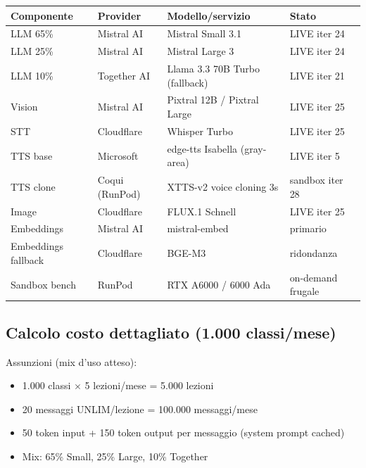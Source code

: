 \documentclass[12pt,a4paper]{article}
\begin{document}
\begin{center}
\renewcommand{\arraystretch}{1.3}
\begin{tabular}{l l l l}
\toprule
\textbf{Componente} & \textbf{Provider} & \textbf{Modello/servizio} & \textbf{Stato} \\
\midrule
LLM 65\%   & Mistral AI    & Mistral Small 3.1 & LIVE iter 24 \\
LLM 25\%   & Mistral AI    & Mistral Large 3   & LIVE iter 24 \\
LLM 10\%   & Together AI   & Llama 3.3 70B Turbo (fallback) & LIVE iter 21 \\
Vision     & Mistral AI    & Pixtral 12B / Pixtral Large    & LIVE iter 25 \\
STT        & Cloudflare    & Whisper Turbo                  & LIVE iter 25 \\
TTS base   & Microsoft     & edge-tts Isabella (gray-area)  & LIVE iter 5 \\
TTS clone  & Coqui (RunPod)& XTTS-v2 voice cloning 3s       & sandbox iter 28 \\
Image      & Cloudflare    & FLUX.1 Schnell                 & LIVE iter 25 \\
Embeddings & Mistral AI    & mistral-embed                   & primario \\
Embeddings fallback & Cloudflare & BGE-M3                    & ridondanza \\
Sandbox bench & RunPod    & RTX A6000 / 6000 Ada            & on-demand frugale \\
\bottomrule
\end{tabular}
\end{center}

\subsection{Calcolo costo dettagliato (1.000 classi/mese)}

Assunzioni (mix d'uso atteso):
\begin{itemize}[leftmargin=*]
  \item 1.000 classi $\times$ 5 lezioni/mese = 5.000 lezioni
  \item 20 messaggi UNLIM/lezione = 100.000 messaggi/mese
  \item 50 token input + 150 token output per messaggio (system prompt cached)
  \item Mix: 65\% Small, 25\% Large, 10\% Together
\end{itemize}
\end{document}
